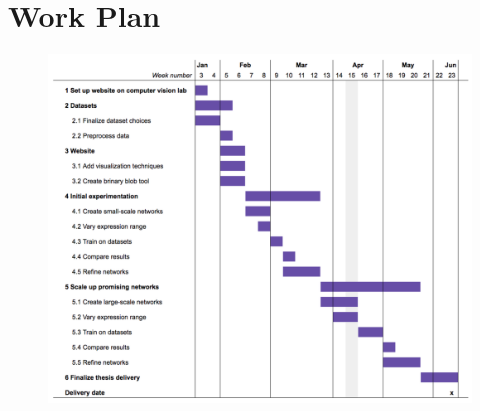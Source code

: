 \newpage
\chapter{Work Plan}

\begin{figure}[H]
\includegraphics[scale=0.7]{images/gantt_diagram.png}
\end{figure}